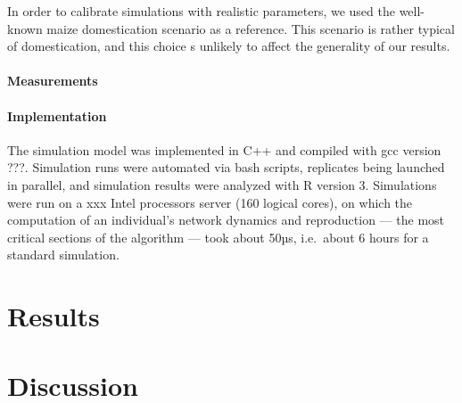 \documentclass[12pt]{article}
\begin{document}
In order to calibrate simulations with realistic parameters, we used the well-known maize domestication scenario as a reference. This scenario is rather typical of domestication, and this choice s unlikely to affect the generality of our results. 

\paragraph{Measurements} 

\paragraph{Implementation} The simulation model was implemented in C++ and compiled with gcc version ???. Simulation runs were automated via bash scripts, replicates being launched in parallel, and simulation results were analyzed with R version 3.  Simulations were run on a xxx Intel processors server (160 logical cores), on which the computation of an individual's network dynamics and reproduction --- the most critical sections of the algorithm --- took about 50µs, i.e.\ about 6 hours for a standard simulation. 

\section{Results}

\section{Discussion}
\end{document}
